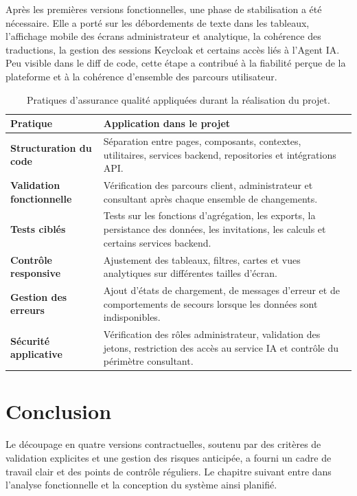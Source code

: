 \documentclass[12pt,a4paper]{report}
\begin{document}
Après les premières versions fonctionnelles, une phase de stabilisation a été nécessaire. Elle a porté sur les débordements de texte dans les tableaux, l'affichage mobile des écrans administrateur et analytique, la cohérence des traductions, la gestion des sessions Keycloak et certains accès liés à l'Agent IA. Peu visible dans le diff de code, cette étape a contribué à la fiabilité perçue de la plateforme et à la cohérence d'ensemble des parcours utilisateur.

\begin{table}[H]
\centering
\caption{Pratiques d'assurance qualité appliquées durant la réalisation du projet.}
\begin{tabularx}{\textwidth}{>{\bfseries}L{4cm}Y}
\toprule
Pratique & Application dans le projet \\
\midrule
Structuration du code & Séparation entre pages, composants, contextes, utilitaires, services backend, repositories et intégrations API. \\
Validation fonctionnelle & Vérification des parcours client, administrateur et consultant après chaque ensemble de changements. \\
Tests ciblés & Tests sur les fonctions d'agrégation, les exports, la persistance des données, les invitations, les calculs et certains services backend. \\
Contrôle responsive & Ajustement des tableaux, filtres, cartes et vues analytiques sur différentes tailles d'écran. \\
Gestion des erreurs & Ajout d'états de chargement, de messages d'erreur et de comportements de secours lorsque les données sont indisponibles. \\
Sécurité applicative & Vérification des rôles administrateur, validation des jetons, restriction des accès au service IA et contrôle du périmètre consultant. \\
\bottomrule
\end{tabularx}
\end{table}

\section{Conclusion}
Le découpage en quatre versions contractuelles, soutenu par des critères de validation explicites et une gestion des risques anticipée, a fourni un cadre de travail clair et des points de contrôle réguliers. Le chapitre suivant entre dans l'analyse fonctionnelle et la conception du système ainsi planifié.
\end{document}
